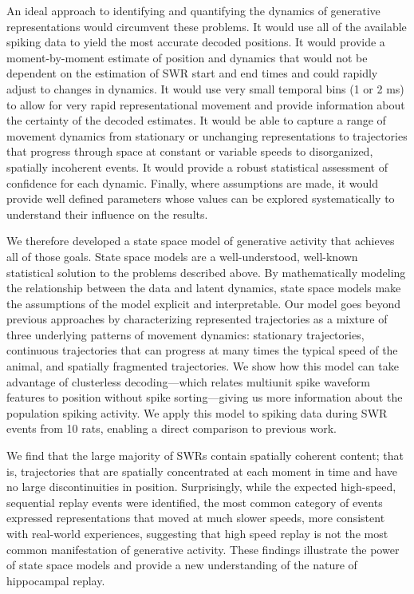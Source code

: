 \documentclass[9pt,lineno]{elife}
\begin{document}
An ideal approach to identifying and quantifying the dynamics of generative representations would circumvent these problems. It would use all of the available spiking data to yield the most accurate decoded positions. It would provide a moment-by-moment estimate of position and dynamics that would not be dependent on the estimation of SWR start and end times and could rapidly adjust to changes in dynamics. It would use very small temporal bins (1 or 2 ms) to allow for very rapid representational movement and provide information about the certainty of the decoded estimates. It would be able to capture a range of movement dynamics from stationary or unchanging representations to trajectories that progress through space at constant or variable speeds to disorganized, spatially incoherent events. It would provide a robust statistical assessment of confidence for each dynamic. Finally, where assumptions are made, it would provide well defined parameters whose values can be explored systematically to understand their influence on the results.

We therefore developed a state space model of generative activity that achieves all of those goals. State space models are a well-understood, well-known statistical solution to the problems described above. By mathematically modeling the relationship between the data and latent dynamics, state space models make the assumptions of the model explicit and interpretable. Our model goes beyond previous approaches \citep{MaboudiUncoveringtemporalstructure2018, DengRapidclassificationhippocampal2016} by characterizing represented trajectories as a mixture of three underlying patterns of movement dynamics: stationary trajectories, continuous trajectories that can progress at many times the typical speed of the animal, and spatially fragmented trajectories. We show how this model can take advantage of clusterless decoding---which relates multiunit spike waveform features to position without spike sorting---giving us more information about the population spiking activity. We apply this model to spiking data during SWR events from 10 rats, enabling a direct comparison to previous work.

We find that the large majority of SWRs contain spatially coherent content; that is, trajectories that are spatially concentrated at each moment in time and have no large discontinuities in position. Surprisingly, while the expected high-speed, sequential replay events were identified, the most common category of events expressed representations that moved at much slower speeds, more consistent with real-world experiences, suggesting that high speed replay is not the most common manifestation of generative activity. These findings illustrate the power of state space models and provide a new understanding of the nature of hippocampal replay.
\end{document}
